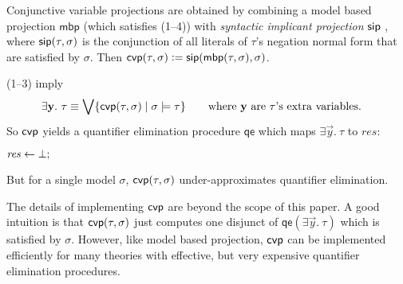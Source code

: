 \begin{remark}
  Conjunctive variable projections are obtained by combining a model based projection $\mathsf{mbp}$ (which satisfies  (1--4)) with \emph{syntactic implicant projection} $\mathsf{sip}$ \cite{adcl}, where $\mathsf{sip}(\tau,\sigma)$ is the conjunction of all literals of $\tau$'s negation normal form that are satisfied by $\sigma$.
  Then $\mathsf{cvp}(\tau,\sigma) \mathrel{\mathop:}= \mathsf{sip}(\mathsf{mbp}(\tau,\sigma),\sigma)$.
\end{remark}
%
\begin{remark}
   (1--3) imply
  \begin{align*}
        \exists \bm{\mathrm{y}}.\ \tau & {} \equiv \bigvee \{\mathsf{cvp}(\tau,\sigma) \mid \sigma \models \tau\} \label{mbp-property} \qquad \text{where $\bm{\mathrm{y}}$ are $\tau$'s extra variables.}
\end{align*}
So $\mathsf{cvp}$ yields a quantifier elimination procedure $\mathsf{qe}$ which maps $\exists
\vec{y}.\ \tau$ to $\mathit{res}$:

\report{\vspace{-1.6em}}


\begin{algorithm}[h!]
\nonl $\mathit{res} \gets \bot;\hspace{.75em}$ 
\end{algorithm}

\paper{\vspace{-.2em}}
\report{\vspace{-2em}}

\noindent
But for a single model $\sigma$, $\mathsf{cvp}(\tau,\sigma)$ under-ap\-prox\-i\-mates quantifier elimination.
\end{remark}
%
The details of implementing $\mathsf{cvp}$ are beyond the scope of this paper.
%
A good intuition\paper{ \pagebreak[3]} is that $\mathsf{cvp}(\tau,\sigma)$ just computes one disjunct of $\mathsf{qe}(\exists \vec{y}.\ \tau)$ which is satisfied by $\sigma$.
%
However, like model based projection, $\mathsf{cvp}$ can be implemented efficiently for many theories with effective, but very expensive quantifier elimination procedures.%
%

